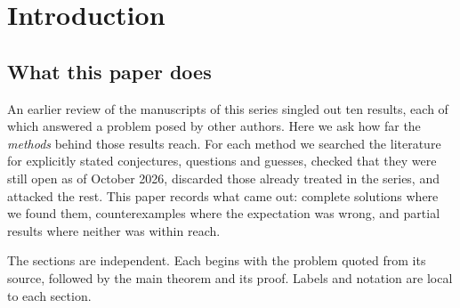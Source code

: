 \documentclass[11pt]{amsart}
\theoremstyle{definition}
\theoremstyle{remark}
\begin{document}
\maketitle
\tableofcontents

\section{Introduction}\label{sec:intro}

\subsection{What this paper does}
An earlier review of the manuscripts of this series singled out ten
results, each of which answered a problem posed by other authors. Here we
ask how far the \emph{methods} behind those results reach. For each
method we searched the literature for explicitly stated conjectures,
questions and guesses, checked that they were still open as of October
2026, discarded those already treated in the series, and attacked the
rest. This paper records what came out: complete solutions where we found
them, counterexamples where the expectation was wrong, and partial results
where neither was within reach.

The sections are independent. Each begins with the problem quoted from its
source, followed by the main theorem and its proof. Labels and notation are
local to each section.
\end{document}
